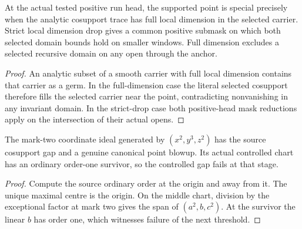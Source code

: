 \begin{theorem}
\label{hir:g1-chronological-support-domain-split}
\leanok
At the actual tested positive run head, the supported point is
special precisely when the analytic cosupport trace has full local
dimension in the selected carrier. Strict local dimension drop
gives a common positive submask on which both selected domain
bounds hold on smaller windows. Full dimension excludes a selected
recursive domain on any open through the anchor.
\end{theorem}
\begin{proof}
An analytic subset of a smooth carrier with full local dimension
contains that carrier as a germ. In the full-dimension case the
literal selected cosupport therefore fills the selected carrier
near the point, contradicting nonvanishing in any invariant
domain. In the strict-drop case both positive-head mask reductions
apply on the intersection of their actual opens.
\end{proof}

\begin{theorem}
\label{hir:g1-canonical-controlled-gap-counterexample}
\leanok
The mark-two coordinate ideal generated by $(x^2,y^3,z^2)$
has the source cosupport gap and a genuine canonical point
blowup. Its actual controlled chart has an ordinary order-one
survivor, so the controlled gap fails at that stage.
\end{theorem}
\begin{proof}
Compute the source ordinary order at the origin and away from
it. The unique maximal centre is the origin. On the middle
chart, division by the exceptional factor at mark two gives
the span of $(a^2,b,c^2)$. At the survivor the linear $b$
has order one, which witnesses failure of the next threshold.
\end{proof}

